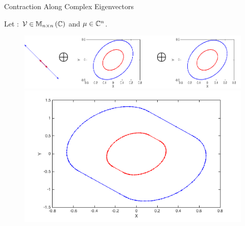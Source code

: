 
\begin{frame}{Contraction Along Complex Eigenvectors}

\begin{block}{}
{\small
Let :
$\mathcal{V}\in\mathbb{M}_{n\times n}\left(\mathbb{C}\right)$ and $\mu\in\mathbb{C}^n$.
}

\begin{enumerate}
\end{enumerate}
%
\end{block}
%
\begin{figure}
\center
\includegraphics[scale=0.25]{figures/CZtopes/eigcontraction.png}\\
\includegraphics[scale=0.25]{figures/CZtopes/contraction-zonotope.png}
\end{figure}
%
\end{frame}

